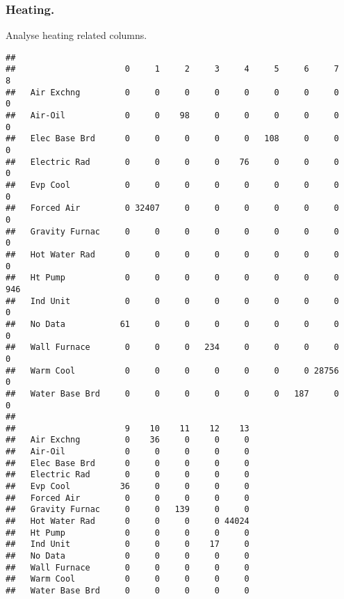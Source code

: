\documentclass[]{article}
\newenvironment{Shaded}{\begin{snugshade}}{\end{snugshade}}
\newcommand{\KeywordTok}[1]{\textcolor[rgb]{0.13,0.29,0.53}{\textbf{#1}}}
\newcommand{\NormalTok}[1]{#1}
\newcommand{\OperatorTok}[1]{\textcolor[rgb]{0.81,0.36,0.00}{\textbf{#1}}}
\begin{document}
\hypertarget{heating.}{%
\subsubsection{Heating.}\label{heating.}}

Analyse heating related columns.

\begin{Shaded}
\end{Shaded}

\begin{verbatim}
##                 
##                      0     1     2     3     4     5     6     7     8
##   Air Exchng         0     0     0     0     0     0     0     0     0
##   Air-Oil            0     0    98     0     0     0     0     0     0
##   Elec Base Brd      0     0     0     0     0   108     0     0     0
##   Electric Rad       0     0     0     0    76     0     0     0     0
##   Evp Cool           0     0     0     0     0     0     0     0     0
##   Forced Air         0 32407     0     0     0     0     0     0     0
##   Gravity Furnac     0     0     0     0     0     0     0     0     0
##   Hot Water Rad      0     0     0     0     0     0     0     0     0
##   Ht Pump            0     0     0     0     0     0     0     0   946
##   Ind Unit           0     0     0     0     0     0     0     0     0
##   No Data           61     0     0     0     0     0     0     0     0
##   Wall Furnace       0     0     0   234     0     0     0     0     0
##   Warm Cool          0     0     0     0     0     0     0 28756     0
##   Water Base Brd     0     0     0     0     0     0   187     0     0
##                 
##                      9    10    11    12    13
##   Air Exchng         0    36     0     0     0
##   Air-Oil            0     0     0     0     0
##   Elec Base Brd      0     0     0     0     0
##   Electric Rad       0     0     0     0     0
##   Evp Cool          36     0     0     0     0
##   Forced Air         0     0     0     0     0
##   Gravity Furnac     0     0   139     0     0
##   Hot Water Rad      0     0     0     0 44024
##   Ht Pump            0     0     0     0     0
##   Ind Unit           0     0     0    17     0
##   No Data            0     0     0     0     0
##   Wall Furnace       0     0     0     0     0
##   Warm Cool          0     0     0     0     0
##   Water Base Brd     0     0     0     0     0
\end{verbatim}
\end{document}
